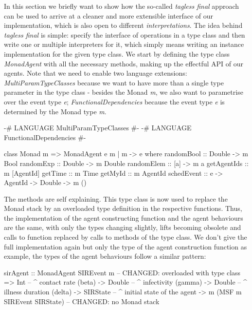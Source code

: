 \medskip

In this section we briefly want to show how the so-called \textit{tagless final} approach \cite{kiselyov_typed_2012} can be used to arrive at a cleaner and more extensible interface of our implementation, which is also open to different \textit{interpretations}. The idea behind \textit{tagless final} is simple: specify the interface of operations in a type class and then write one or multiple interpreters for it, which simply means writing an instance implementation for the given type class. We start by defining the type class \textit{MonadAgent} with all the necessary methods, making up the effectful API of our agents. Note that we need to enable two language extensions: \textit{MultiParamTypeClasses} because we want to have more than a single type parameter in the type class - besides the Monad \textit{m}, we also want to parametrise over the event type \textit{e}; \textit{FunctionalDependencies} because the event type \textit{e} is determined by the Monad type \textit{m}.

\begin{HaskellCode}
{-# LANGUAGE MultiParamTypeClasses  #-}
{-# LANGUAGE FunctionalDependencies #-}

class Monad m => MonadAgent e m | m -> e where
  randomBool  :: Double -> m Bool
  randomExp   :: Double -> m Double
  randomElem  :: [a] -> m a
  getAgentIds :: m [AgentId]
  getTime     :: m Time
  getMyId     :: m AgentId
  schedEvent  :: e -> AgentId -> Double -> m ()
\end{HaskellCode}

The methods are self explaining. This type class is now used to replace the Monad stack by an overloaded type definition in the respective functions. Thus, the implementation of the agent constructing function and the agent behaviours are the same, with only the types changing slightly, lifts becoming obsolete and calls to function replaced by calls to methods of the type class. We don't give the full implementation again but only the type of the agent construction function as example, the types of the agent behaviours follow a similar pattern: 

\begin{HaskellCode}
sirAgent :: MonadAgent SIREvent m  -- CHANGED: overloaded with type class
         => Int         -- ^ contact rate (beta)
         -> Double      -- ^ infectivity (gamma)
         -> Double      -- ^ illness duration (delta)
         -> SIRState    -- ^ initial state of the agent
         -> m (MSF m SIREvent SIRState) -- CHANGED: no Monad stack
\end{HaskellCode}

